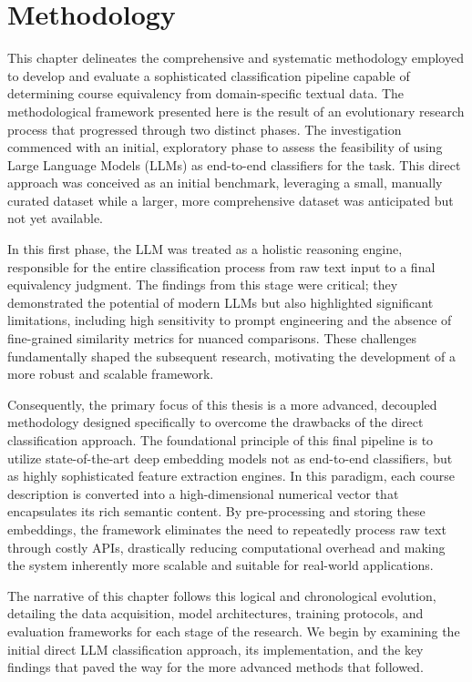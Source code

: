 \chapter{Methodology}\label{ch:3}
This chapter delineates the comprehensive and systematic methodology employed to develop and evaluate a sophisticated classification pipeline capable of determining course equivalency from domain-specific textual data. The methodological framework presented here is the result of an evolutionary research process that progressed through two distinct phases. The investigation commenced with an initial, exploratory phase to assess the feasibility of using Large Language Models (LLMs) as end-to-end classifiers for the task. This direct approach was conceived as an initial benchmark, leveraging a small, manually curated dataset while a larger, more comprehensive dataset was anticipated but not yet available.

In this first phase, the LLM was treated as a holistic reasoning engine, responsible for the entire classification process from raw text input to a final equivalency judgment. The findings from this stage were critical; they demonstrated the potential of modern LLMs but also highlighted significant limitations, including high sensitivity to prompt engineering and the absence of fine-grained similarity metrics for nuanced comparisons. These challenges fundamentally shaped the subsequent research, motivating the development of a more robust and scalable framework.

Consequently, the primary focus of this thesis is a more advanced, decoupled methodology designed specifically to overcome the drawbacks of the direct classification approach. The foundational principle of this final pipeline is to utilize state-of-the-art deep embedding models not as end-to-end classifiers, but as highly sophisticated feature extraction engines. In this paradigm, each course description is converted into a high-dimensional numerical vector that encapsulates its rich semantic content. By pre-processing and storing these embeddings, the framework eliminates the need to repeatedly process raw text through costly APIs, drastically reducing computational overhead and making the system inherently more scalable and suitable for real-world applications.

The narrative of this chapter follows this logical and chronological evolution, detailing the data acquisition, model architectures, training protocols, and evaluation frameworks for each stage of the research. We begin by examining the initial direct LLM classification approach, its implementation, and the key findings that paved the way for the more advanced methods that followed.

